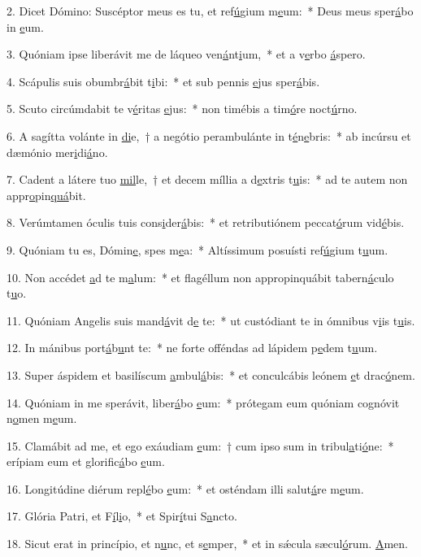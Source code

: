 2. Dicet Dómino: Suscéptor meus es tu, et ref\uline{ú}gium m\uline{e}um:~* Deus meus sper\uline{á}bo in \uline{e}um.\par 
3. Quóniam ipse liberávit me de láqueo ven\uline{á}nt\uline{i}um,~* et a v\uline{e}rbo \uline{á}spero.\par 
4. Scápulis suis obumbr\uline{á}bit t\uline{i}bi:~* et sub pennis \uline{e}jus sper\uline{á}bis.\par 
5. Scuto circúmdabit te v\uline{é}ritas \uline{e}jus:~* non timébis a tim\uline{ó}re noct\uline{ú}rno.\par 
6. A sagítta volánte in \uline{di}e,~† a negótio perambulánte in t\uline{é}n\uline{e}bris:~* ab incúrsu et dæmónio mer\uline{i}di\uline{á}no.\par 
7. Cadent a látere tuo \uline{mil}le,~† et decem míllia a d\uline{e}xtris t\uline{u}is:~* ad te autem non appr\uline{o}pin\uline{quá}bit.\par 
8. Verúmtamen óculis tuis cons\uline{i}der\uline{á}bis:~* et retributiónem peccat\uline{ó}rum vid\uline{é}bis.\par 
9. Quóniam tu es, Dómin\uline{e}, spes m\uline{e}a:~* Altíssimum posuísti ref\uline{ú}gium t\uline{u}um.\par 
10. Non accédet \uline{a}d te m\uline{a}lum:~* et flagéllum non appropinquábit tabern\uline{á}culo t\uline{u}o.\par 
11. Quóniam Angelis suis mand\uline{á}vit d\uline{e} te:~* ut custódiant te in ómnibus v\uline{i}is t\uline{u}is.\par 
12. In mánibus port\uline{á}b\uline{u}nt te:~* ne forte offéndas ad lápidem p\uline{e}dem t\uline{u}um.\par 
13. Super áspidem et basilíscum \uline{a}mbul\uline{á}bis:~* et conculcábis leónem \uline{e}t drac\uline{ó}nem.\par 
14. Quóniam in me sperávit, liber\uline{á}bo \uline{e}um:~* prótegam eum quóniam cognóvit n\uline{o}men m\uline{e}um.\par 
15. Clamábit ad me, et ego exáudiam \uline{e}um:~† cum ipso sum in tribul\uline{a}ti\uline{ó}ne:~* erípiam eum et glorific\uline{á}bo \uline{e}um.\par 
16. Longitúdine diérum repl\uline{é}bo \uline{e}um:~* et osténdam illi salut\uline{á}re m\uline{e}um.\par 
17. Glória Patri, et F\uline{í}l\uline{i}o,~* et Spir\uline{í}tui S\uline{a}ncto.\par 
18. Sicut erat in princípio, et n\uline{u}nc, et s\uline{e}mper,~* et in sǽcula sæcul\uline{ó}rum. \uline{A}men.\par 
